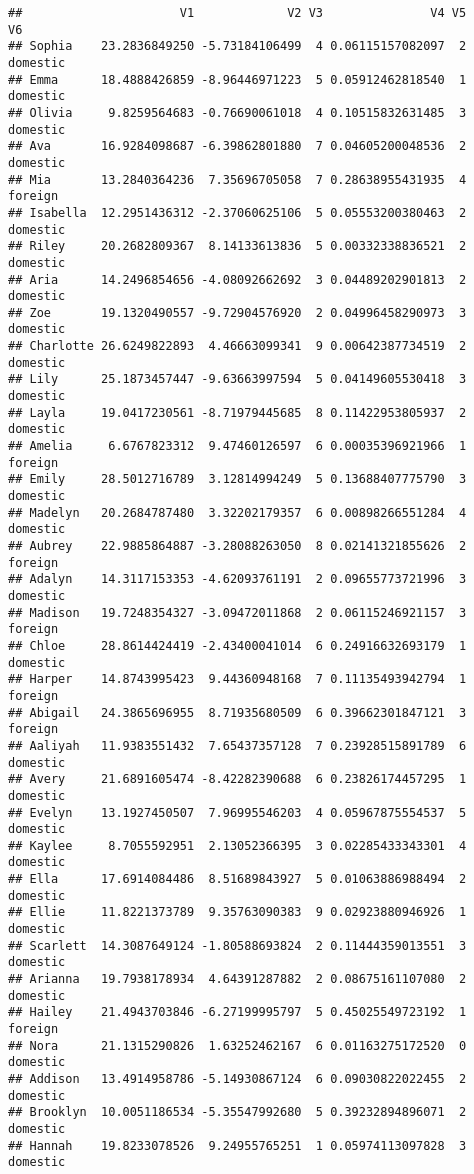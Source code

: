 \documentclass[
]{article}
\begin{document}
\begin{verbatim}
##                      V1             V2 V3               V4 V5       V6
## Sophia    23.2836849250 -5.73184106499  4 0.06115157082097  2 domestic
## Emma      18.4888426859 -8.96446971223  5 0.05912462818540  1 domestic
## Olivia     9.8259564683 -0.76690061018  4 0.10515832631485  3 domestic
## Ava       16.9284098687 -6.39862801880  7 0.04605200048536  2 domestic
## Mia       13.2840364236  7.35696705058  7 0.28638955431935  4  foreign
## Isabella  12.2951436312 -2.37060625106  5 0.05553200380463  2 domestic
## Riley     20.2682809367  8.14133613836  5 0.00332338836521  2 domestic
## Aria      14.2496854656 -4.08092662692  3 0.04489202901813  2 domestic
## Zoe       19.1320490557 -9.72904576920  2 0.04996458290973  3 domestic
## Charlotte 26.6249822893  4.46663099341  9 0.00642387734519  2 domestic
## Lily      25.1873457447 -9.63663997594  5 0.04149605530418  3 domestic
## Layla     19.0417230561 -8.71979445685  8 0.11422953805937  2 domestic
## Amelia     6.6767823312  9.47460126597  6 0.00035396921966  1  foreign
## Emily     28.5012716789  3.12814994249  5 0.13688407775790  3 domestic
## Madelyn   20.2684787480  3.32202179357  6 0.00898266551284  4 domestic
## Aubrey    22.9885864887 -3.28088263050  8 0.02141321855626  2  foreign
## Adalyn    14.3117153353 -4.62093761191  2 0.09655773721996  3 domestic
## Madison   19.7248354327 -3.09472011868  2 0.06115246921157  3  foreign
## Chloe     28.8614424419 -2.43400041014  6 0.24916632693179  1 domestic
## Harper    14.8743995423  9.44360948168  7 0.11135493942794  1  foreign
## Abigail   24.3865696955  8.71935680509  6 0.39662301847121  3  foreign
## Aaliyah   11.9383551432  7.65437357128  7 0.23928515891789  6 domestic
## Avery     21.6891605474 -8.42282390688  6 0.23826174457295  1 domestic
## Evelyn    13.1927450507  7.96995546203  4 0.05967875554537  5 domestic
## Kaylee     8.7055592951  2.13052366395  3 0.02285433343301  4 domestic
## Ella      17.6914084486  8.51689843927  5 0.01063886988494  2 domestic
## Ellie     11.8221373789  9.35763090383  9 0.02923880946926  1 domestic
## Scarlett  14.3087649124 -1.80588693824  2 0.11444359013551  3 domestic
## Arianna   19.7938178934  4.64391287882  2 0.08675161107080  2 domestic
## Hailey    21.4943703846 -6.27199995797  5 0.45025549723192  1  foreign
## Nora      21.1315290826  1.63252462167  6 0.01163275172520  0 domestic
## Addison   13.4914958786 -5.14930867124  6 0.09030822022455  2 domestic
## Brooklyn  10.0051186534 -5.35547992680  5 0.39232894896071  2 domestic
## Hannah    19.8233078526  9.24955765251  1 0.05974113097828  3 domestic

\end{verbatim}
\end{document}

